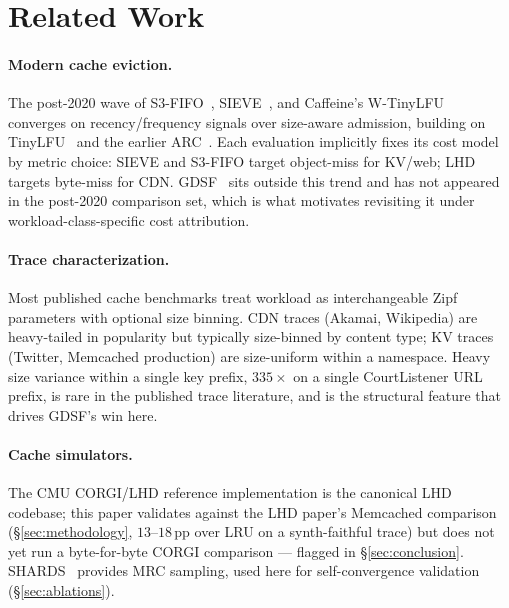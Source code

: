 \documentclass[letterpaper,twocolumn,10pt]{article}
\begin{document}
\section{Related Work}\label{sec:related}

\paragraph{Modern cache eviction.} The post-2020 wave of
S3-FIFO~\cite{yang2023fifo}, SIEVE~\cite{zhang2024sieve}, and
Caffeine's W-TinyLFU~\cite{caffeine2024} converges on
recency/frequency signals over size-aware admission, building on
TinyLFU~\cite{einziger2017tinylfu} and the earlier
ARC~\cite{megiddo2003arc}. Each evaluation implicitly fixes its cost
model by metric choice: SIEVE and S3-FIFO target object-miss for
KV/web; LHD~\cite{beckmann2018lhd} targets byte-miss for CDN.
GDSF~\cite{cherkasova1998gdsf} sits outside this trend and has not
appeared in the post-2020 comparison set, which is what motivates
revisiting it under workload-class-specific cost attribution.

\paragraph{Trace characterization.} Most published cache benchmarks
treat workload as interchangeable Zipf parameters with optional size
binning. CDN traces (Akamai, Wikipedia) are heavy-tailed in
popularity but typically size-binned by content type; KV traces
(Twitter, Memcached production) are size-uniform within a namespace.
Heavy size variance within a single key prefix, 
$335\times$ on a single CourtListener URL prefix, is rare in the
published trace literature, and is the structural feature that drives
GDSF's win here.

\paragraph{Cache simulators.} The CMU CORGI/LHD reference
implementation is the canonical LHD codebase; this paper validates
against the LHD paper's Memcached comparison
(\S\ref{sec:methodology}, $13$--$18$\,pp over LRU on a synth-faithful
trace) but does not yet run a byte-for-byte CORGI comparison —
flagged in \S\ref{sec:conclusion}.
SHARDS~\cite{waldspurger2015shards} provides MRC sampling, used here
for self-convergence validation (\S\ref{sec:ablations}).
\end{document}
